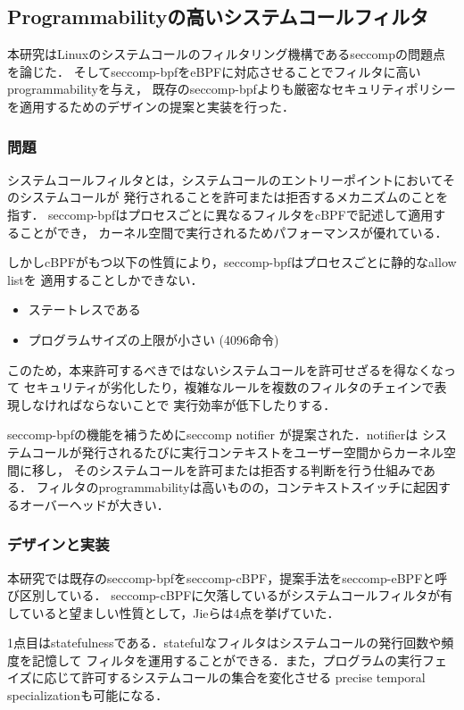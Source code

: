 \documentclass[platex,a4j,10pt,twoside,twocolumn,dvipdfmx]{jsarticle}
\begin{document}
\subsection{Programmabilityの高いシステムコールフィルタ \cite{jia2023programmable}}
本研究はLinuxのシステムコールのフィルタリング機構であるseccompの問題点を論じた．
そしてseccomp-bpfをeBPFに対応させることでフィルタに高いprogrammabilityを与え，
既存のseccomp-bpfよりも厳密なセキュリティポリシーを適用するためのデザインの提案と実装を行った．

\subsubsection{問題}
システムコールフィルタとは，システムコールのエントリーポイントにおいてそのシステムコールが
発行されることを許可または拒否するメカニズムのことを指す．
seccomp-bpfはプロセスごとに異なるフィルタをcBPFで記述して適用することができ，
カーネル空間で実行されるためパフォーマンスが優れている．

しかしcBPFがもつ以下の性質により，seccomp-bpfはプロセスごとに静的なallow listを
適用することしかできない．
\begin{itemize}
  \item ステートレスである
  \item プログラムサイズの上限が小さい (4096命令)
\end{itemize}
このため，本来許可するべきではないシステムコールを許可せざるを得なくなって
セキュリティが劣化したり，複雑なルールを複数のフィルタのチェインで表現しなければならないことで
実行効率が低下したりする．

seccomp-bpfの機能を補うためにseccomp notifier \cite{TheSecco46:online} が提案された．notifierは
システムコールが発行されるたびに実行コンテキストをユーザー空間からカーネル空間に移し，
そのシステムコールを許可または拒否する判断を行う仕組みである．
フィルタのprogrammabilityは高いものの，コンテキストスイッチに起因するオーバーヘッドが大きい．

\subsubsection{デザインと実装}
本研究では既存のseccomp-bpfをseccomp-cBPF，提案手法をseccomp-eBPFと呼び区別している．
seccomp-cBPFに欠落しているがシステムコールフィルタが有していると望ましい性質として，Jieらは4点を挙げていた．

1点目はstatefulnessである．statefulなフィルタはシステムコールの発行回数や頻度を記憶して
フィルタを運用することができる．また，プログラムの実行フェイズに応じて許可するシステムコールの集合を変化させる
precise temporal specializationも可能になる．
\end{document}
